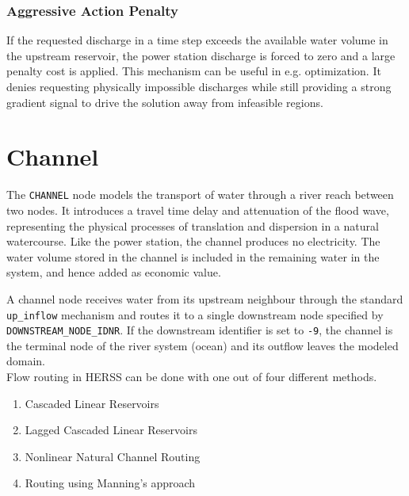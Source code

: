 \documentclass[a4paper, 12pt]{report}
\begin{document}
	\subsubsection{Aggressive Action Penalty}

	If the requested discharge in a time step exceeds the available water volume in the upstream
	reservoir, the power station discharge is forced to zero and a large penalty cost is applied.
	This mechanism can be useful in e.g. optimization. It denies requesting physically impossible discharges while
	still providing a strong gradient signal to drive the solution away from infeasible regions.
	\newpage 






	\section{Channel}
	\label{sec:channel}

	The \texttt{CHANNEL} node models the transport of water through a river reach between two
	nodes. It introduces a travel time delay and attenuation of the flood wave, representing the
	physical processes of translation and dispersion in a natural watercourse. Like the power
	station, the channel produces no electricity. The water volume stored in the channel is included in the remaining water in the system, and hence added as economic value.

	A channel node receives water from its upstream neighbour through the standard
	\texttt{up\_inflow} mechanism and routes it to a single downstream node specified by
	\texttt{DOWNSTREAM\_NODE\_IDNR}. If the downstream identifier is set to \texttt{-9}, the
	channel is the terminal node of the river system (ocean) and its outflow leaves the modeled domain. \\

	
	


	Flow routing in HERSS can be done with one out of four different methods. 

	\begin{enumerate}[label=\Alph*.]
		\item Cascaded Linear Reservoirs 
		\item Lagged Cascaded Linear Reservoirs
		\item Nonlinear Natural Channel Routing 
		\item Routing using Manning's approach
	\end{enumerate}
\end{document}
